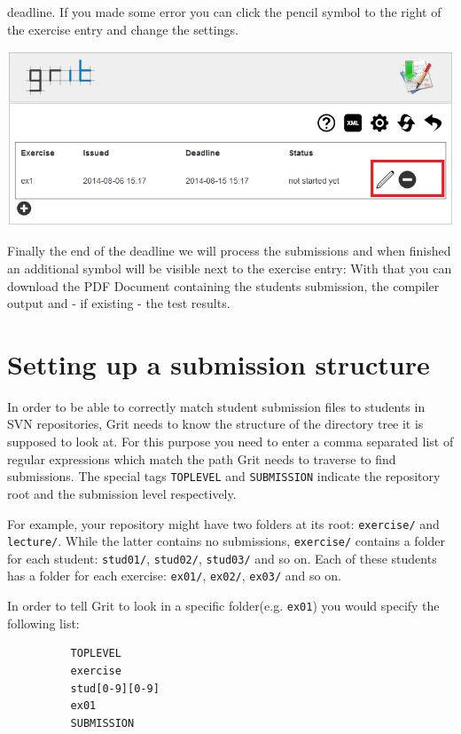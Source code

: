 \documentclass[10pt,a4paper, titlepage, toc=idx]{scrreprt}
\theoremstyle{definition}
\theoremstyle{plain}
\newcommand*{\product}{Grit}
\begin{document}
        deadline. If you made some error you can click the pencil
        symbol to the right of the exercise entry and change the
        settings.
	\begin{center}
          \includegraphics[width=.55\textwidth]{pictures/exercise_overview2.png}
	\end{center}
	Finally the end of the deadline we will process the
        submissions and when finished an additional symbol will be
        visible next to the exercise entry: With that you can download
        the PDF Document containing the students submission, the
        compiler output and - if existing - the test results.

	\section{Setting up a submission structure}\label{structure}
        In order to be able to correctly match student submission
        files to students in SVN repositories, \product{} needs to
        know the structure of the directory tree it is supposed to
        look at. For this purpose you need to enter a comma separated
        list of regular expressions which match the path \product{}
        needs to traverse to find submissions. The special tags
        \texttt{TOPLEVEL} and \texttt{SUBMISSION} indicate the
        repository root and the submission level respectively.

        For example, your repository might have two folders at its
        root: \texttt{exercise/} and \texttt{lecture/}. While the
        latter contains no submissions, \texttt{exercise/} contains a
        folder for each student: \texttt{stud01/}, \texttt{stud02/},
        \texttt{stud03/} and so on. Each of these students has a
        folder for each exercise: \texttt{ex01/}, \texttt{ex02/},
        \texttt{ex03/} and so on.

        In order to tell \product{} to look in a specific folder(e.g. \texttt{ex01})
        you would specify the following list:

        \begin{lstlisting}
          TOPLEVEL
          exercise
          stud[0-9][0-9]
          ex01
          SUBMISSION
\end{lstlisting}
\end{document}
